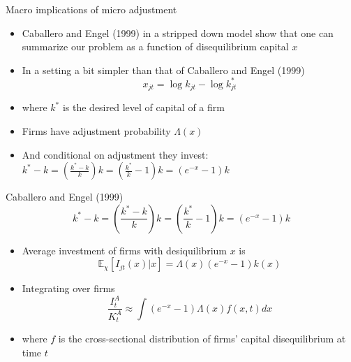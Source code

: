 \documentclass[11pt,aspectratio=169,xcolor={dvipsnames},hyperref={pdftex,pdfpagemode=UseNone,hidelinks,pdfdisplaydoctitle=true},usepdftitle=false]{beamer}
\begin{document}
\begin{frame}{Macro implications of micro adjustment}
\begin{itemize}
\item Caballero and Engel (1999) in a stripped down model show that one can summarize our problem as a function of disequilibrium capital $x$
\pause
\item In a setting a bit simpler than that of Caballero and Engel (1999) 
$$x_{jt} = \log k_{jt} - \log k^*_{jt}$$
\pause
\item where $k^*$ is the desired level of capital of a firm
\pause
\item Firms have adjustment probability $\Lambda(x)$
\pause
\item And conditional on adjustment they invest:
$k^* - k = \left(\frac{k^* - k}{k}\right) k = \left(\frac{k^*}{k} - 1 \right) k = (e^{-x} - 1)k$
\end{itemize}
\end{frame}



\begin{frame}{Caballero and Engel (1999)}
$$k^* - k = \left(\frac{k^* - k}{k}\right) k = \left(\frac{k^*}{k} - 1 \right) k = (e^{-x} - 1)k$$
\pause
\begin{itemize}
\item Average investment of firms with desiquilibrium $x$ is
$$\mathbb{E}_{\chi} \left[ I_{jt}(x) | x \right] = \Lambda(x)   (e^{-x} - 1)k(x)$$
\pause
\vspace{-0.5cm}
\item Integrating over firms
$$\frac{I_t^A}{K^A_t} \approx \int  (e^{-x} - 1)\Lambda(x)f(x,t) dx$$
\pause
\item where $f$ is the cross-sectional distribution of firms' capital disequilibrium at time $t$
\end{itemize}
\end{frame}
\end{document}
